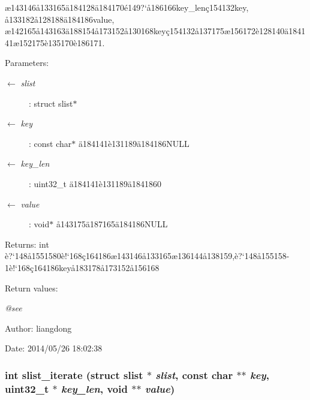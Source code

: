 \ae{}143146\aa{}133165\"{a}184128\"{a}184170\'{e}149?`\aa{}186166key\_\-len\c{c}154132key, \aa{}133182\aa{}128188\"{a}184186value, \ae{}142165\aa{}143163\"{a}188154\aa{}173152\aa{}130168key\c{c}154132\aa{}137175\ae{}156172\`{e}128140\"{a}184141\ae{}152175\`{e}135170\`{e}186171. 

\begin{Desc}
\item[Parameters:]
\begin{description}
\item[\mbox{$\leftarrow$} {\em slist}]: struct slist$\ast$ \item[\mbox{$\leftarrow$} {\em key}]: const char$\ast$ \"{a}184141\`{e}131189\"{a}184186NULL \item[\mbox{$\leftarrow$} {\em key\_\-len}]: uint32\_\-t \"{a}184141\`{e}131189\"{a}1841860 \item[\mbox{$\leftarrow$} {\em value}]: void$\ast$ \aa{}143175\"{a}187165\"{a}184186NULL \end{description}
\end{Desc}
\begin{Desc}
\item[Returns:]int \`{e}?`148\aa{}1551580\`{e}!`168\c{c}164186\ae{}143146\aa{}133165\ae{}136144\aa{}138159,\`{e}?`148\aa{}155158-1\`{e}!`168\c{c}164186key\aa{}183178\aa{}173152\aa{}156168 \end{Desc}
\begin{Desc}
\item[Return values:]
\begin{description}
\item[{\em @see}]\end{description}
\end{Desc}
\begin{Desc}
\item[Author:]liangdong \end{Desc}
\begin{Desc}
\item[Date:]2014/05/26 18:02:38 \end{Desc}
\subsubsection{\setlength{\rightskip}{0pt plus 5cm}int slist\_\-iterate (struct slist $\ast$ {\em slist}, const char $\ast$$\ast$ {\em key}, uint32\_\-t $\ast$ {\em key\_\-len}, void $\ast$$\ast$ {\em value})}\label{slist_8h_a11}


